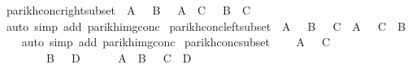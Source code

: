 \begin{isabellebody}
\ parikh{\isacharunderscore}{\kern0pt}conc{\isacharunderscore}{\kern0pt}right{\isacharunderscore}{\kern0pt}subset{\isacharcolon}{\kern0pt}\ {\isachardoublequoteopen}{\isasymPsi}\ A\ {\isasymsubseteq}\ {\isasymPsi}\ B\ {\isasymLongrightarrow}\ {\isasymPsi}\ {\isacharparenleft}{\kern0pt}A\ {\isacharat}{\kern0pt}{\isacharat}{\kern0pt}\ C{\isacharparenright}{\kern0pt}\ {\isasymsubseteq}\ {\isasymPsi}\ {\isacharparenleft}{\kern0pt}B\ {\isacharat}{\kern0pt}{\isacharat}{\kern0pt}\ C{\isacharparenright}{\kern0pt}{\isachardoublequoteclose}\isanewline
%
\isadelimproof
\ \ %
\endisadelimproof
%
\isatagproof
{}\isamarkupfalse%
\ {\isacharparenleft}{\kern0pt}auto\ simp\ add{\isacharcolon}{\kern0pt}\ parikh{\isacharunderscore}{\kern0pt}img{\isacharunderscore}{\kern0pt}conc{\isacharparenright}{\kern0pt}%
\endisatagproof
{\isafoldproof}%
%
\isadelimproof
\isanewline
%
\endisadelimproof
\isanewline
{}\isamarkupfalse%
\ parikh{\isacharunderscore}{\kern0pt}conc{\isacharunderscore}{\kern0pt}left{\isacharunderscore}{\kern0pt}subset{\isacharcolon}{\kern0pt}\ {\isachardoublequoteopen}{\isasymPsi}\ A\ {\isasymsubseteq}\ {\isasymPsi}\ B\ {\isasymLongrightarrow}\ {\isasymPsi}\ {\isacharparenleft}{\kern0pt}C\ {\isacharat}{\kern0pt}{\isacharat}{\kern0pt}\ A{\isacharparenright}{\kern0pt}\ {\isasymsubseteq}\ {\isasymPsi}\ {\isacharparenleft}{\kern0pt}C\ {\isacharat}{\kern0pt}{\isacharat}{\kern0pt}\ B{\isacharparenright}{\kern0pt}{\isachardoublequoteclose}\isanewline
%
\isadelimproof
\ \ %
\endisadelimproof
%
\isatagproof
{}\isamarkupfalse%
\ {\isacharparenleft}{\kern0pt}auto\ simp\ add{\isacharcolon}{\kern0pt}\ parikh{\isacharunderscore}{\kern0pt}img{\isacharunderscore}{\kern0pt}conc{\isacharparenright}{\kern0pt}%
\endisatagproof
{\isafoldproof}%
%
\isadelimproof
\isanewline
%
\endisadelimproof
\isanewline
{}\isamarkupfalse%
\ parikh{\isacharunderscore}{\kern0pt}conc{\isacharunderscore}{\kern0pt}subset{\isacharcolon}{\kern0pt}\isanewline
\ \ \ {\isachardoublequoteopen}{\isasymPsi}\ A\ {\isasymsubseteq}\ {\isasymPsi}\ C{\isachardoublequoteclose}\isanewline
\ \ \ \ \ \ \ {\isachardoublequoteopen}{\isasymPsi}\ B\ {\isasymsubseteq}\ {\isasymPsi}\ D{\isachardoublequoteclose}\isanewline
\ \ \ \ \ {\isachardoublequoteopen}{\isasymPsi}\ {\isacharparenleft}{\kern0pt}A\ {\isacharat}{\kern0pt}{\isacharat}{\kern0pt}\ B{\isacharparenright}{\kern0pt}\ {\isasymsubseteq}\ {\isasymPsi}\ {\isacharparenleft}{\kern0pt}C\ {\isacharat}{\kern0pt}{\isacharat}{\kern0pt}\ D{\isacharparenright}{\kern0pt}{\isachardoublequoteclose}\isanewline

\end{isabellebody}
